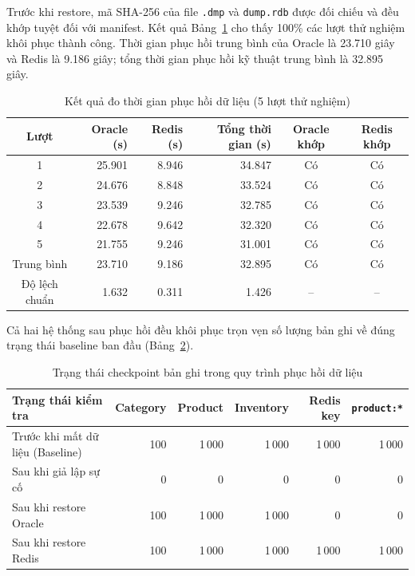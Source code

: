 Trước khi restore, mã SHA-256 của file \texttt{.dmp} và \texttt{dump.rdb} được đối chiếu và đều khớp tuyệt đối với manifest. Kết quả Bảng~\ref{tab:bk-recovery-duration} cho thấy 100\% các lượt thử nghiệm khôi phục thành công. Thời gian phục hồi trung bình của Oracle là 23.710 giây và Redis là 9.186 giây; tổng thời gian phục hồi kỹ thuật trung bình là 32.895 giây.

\begin{table}[H]
    \centering
    \caption{Kết quả đo thời gian phục hồi dữ liệu (5 lượt thử nghiệm)}
    \label{tab:bk-recovery-duration}
    \begin{tabular}{@{}crrrcc@{}}
        \toprule
        Lượt & Oracle (s) & Redis (s) & Tổng thời gian (s) & Oracle khớp & Redis khớp \\
        \midrule
        1 & 25.901 & 8.946 & 34.847 & Có & Có \\
        2 & 24.676 & 8.848 & 33.524 & Có & Có \\
        3 & 23.539 & 9.246 & 32.785 & Có & Có \\
        4 & 22.678 & 9.642 & 32.320 & Có & Có \\
        5 & 21.755 & 9.246 & 31.001 & Có & Có \\
        \midrule
        Trung bình & 23.710 & 9.186 & 32.895 & Có & Có \\
        Độ lệch chuẩn & 1.632 & 0.311 & 1.426 & -- & -- \\
        \bottomrule
    \end{tabular}
\end{table}

Cả hai hệ thống sau phục hồi đều khôi phục trọn vẹn số lượng bản ghi về đúng trạng thái baseline ban đầu (Bảng~\ref{tab:bk-recovery-checkpoint}).

\begin{table}[H]
    \centering
    \caption{Trạng thái checkpoint bản ghi trong quy trình phục hồi dữ liệu}
    \label{tab:bk-recovery-checkpoint}
    \begin{tabularx}{\textwidth}{@{}Xrrrrr@{}}
        \toprule
        Trạng thái kiểm tra & Category & Product & Inventory & Redis key & \texttt{product:*} \\
        \midrule
        Trước khi mất dữ liệu (Baseline) & 100 & 1\,000 & 1\,000 & 1\,000 & 1\,000 \\
        Sau khi giả lập sự cố & 0 & 0 & 0 & 0 & 0 \\
        Sau khi restore Oracle & 100 & 1\,000 & 1\,000 & 0 & 0 \\
        Sau khi restore Redis & 100 & 1\,000 & 1\,000 & 1\,000 & 1\,000 \\
        \bottomrule
    \end{tabularx}
\end{table}

